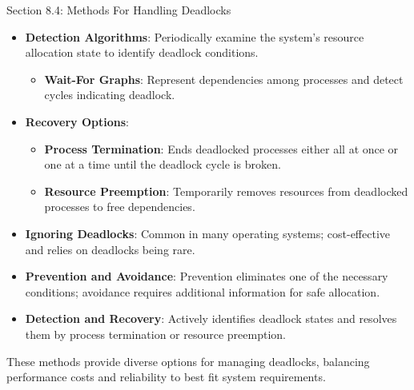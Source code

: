 \begin{notes}{Section 8.4: Methods For Handling Deadlocks}
    \begin{highlight}
    
        \begin{itemize}
            \item \textbf{Detection Algorithms}: Periodically examine the system's resource allocation state to identify deadlock conditions.
                \begin{itemize}
                    \item \textbf{Wait-For Graphs}: Represent dependencies among processes and detect cycles indicating deadlock.
                \end{itemize}
            \item \textbf{Recovery Options}: 
                \begin{itemize}
                    \item \textbf{Process Termination}: Ends deadlocked processes either all at once or one at a time until the deadlock cycle is broken.
                    \item \textbf{Resource Preemption}: Temporarily removes resources from deadlocked processes to free dependencies.
                \end{itemize}
        \end{itemize}
    
    \end{highlight}
    
    \begin{highlight}
    
        \begin{itemize}
            \item \textbf{Ignoring Deadlocks}: Common in many operating systems; cost-effective and relies on deadlocks being rare.
            \item \textbf{Prevention and Avoidance}: Prevention eliminates one of the necessary conditions; avoidance requires additional information for safe allocation.
            \item \textbf{Detection and Recovery}: Actively identifies deadlock states and resolves them by process termination or resource preemption.
        \end{itemize}
    
    These methods provide diverse options for managing deadlocks, balancing performance costs and reliability to best fit system requirements.
    
    \end{highlight}
\end{notes}

